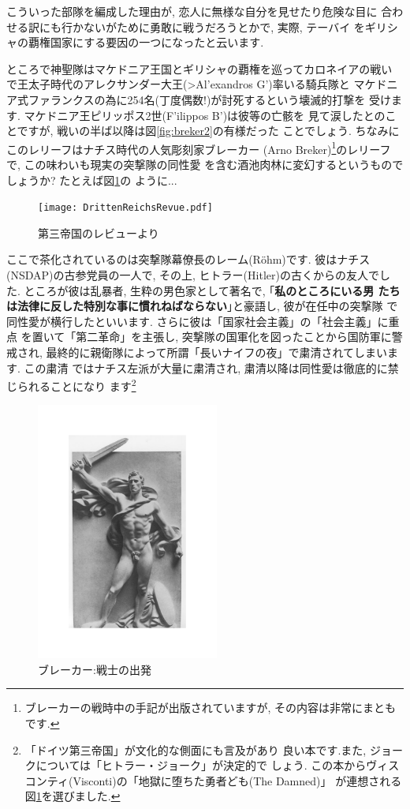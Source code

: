 \documentclass[b5j,8pt,twocolumn]{ltjsarticle}
\newcommand{\textgreek}[1]{\begingroup\fontencoding{LGR}\selectfont#1\endgroup}
\newcommand{\textgreek}[1]{\begingroup\fontencoding{LGR}\selectfont#1\endgroup}
\begin{document}
こういった部隊を編成した理由が, 恋人に無様な自分を見せたり危険な目に
合わせる訳にも行かないがために勇敢に戦うだろうとかで, 実際, テーバイ
をギリシャの覇権国家にする要因の一つになったと云います.
\newline

ところで神聖隊はマケドニア王国とギリシャの覇権を巡ってカロネイアの戦い
で王太子時代のアレクサンダー大王(\textgreek{>Al'exandros G'})率いる騎兵隊と
マケドニア式ファランクスの為に254名(丁度偶数!)が討死するという壊滅的打撃を
受けます. マケドニア王ピリッポス2世(\textgreek{F'ilippos B'})は彼等の亡骸を
見て涙したとのことですが, 戦いの半ば以降は図\ref{fig:breker2}の有様だった
ことでしょう. ちなみにこのレリーフはナチス時代の人気彫刻家ブレーカー
(Arno Breker)\footnote{ブレーカーの戦時中の手記が出版されていますが,
 その内容は非常にまともです.}のレリーフで, この味わいも現実の突撃隊の同性愛
を含む酒池肉林に変幻するというものでしょうか? たとえば図\ref{fig:rrevue}の
ように... 

\begin{figure}[htbp]
\begin{center}
\texttt{[image: DrittenReichsRevue.pdf]}
\caption{第三帝国のレビューより\cite{関}}
\label{fig:rrevue}
\end{center}
\end{figure}

ここで茶化されているのは突撃隊幕僚長のレーム(R\"ohm)です. 彼はナチス
(NSDAP)の古参党員の一人で, その上, ヒトラー(Hitler)の古くからの友人でした.
 ところが彼は乱暴者, 生粋の男色家として著名で, ｢\textbf{私のところにいる男
 たちは法律に反した特別な事に慣れねばならない}｣と豪語し, 彼が在任中の突撃隊
で同性愛が横行したといいます. さらに彼は「国家社会主義」の「社会主義」に重点
を置いて「第二革命」を主張し, 突撃隊の国軍化を図ったことから国防軍に警戒され,
最終的に親衛隊によって所謂「長いナイフの夜」で粛清されてしまいます. この粛清
ではナチス左派が大量に粛清され, 粛清以降は同性愛は徹底的に禁じられることになり
ます\footnote{「ドイツ第三帝国」\cite{クラーザー}が文化的な側面にも言及があり
良い本です.また, ジョークについては「ヒトラー・ジョーク」\cite{関}が決定的で
しょう. この本からヴィスコンティ(Visconti)の「地獄に堕ちた勇者ども(The Damned)」
が連想される図\ref{fig:rrevue}を選びました.}
\newpage

\begin{figure}
\includegraphics[width=6cm]{Breker2_relief.pdf}
\caption{ブレーカー:戦士の出発}
\label{fig:breker1}
\end{figure}
\end{document}

